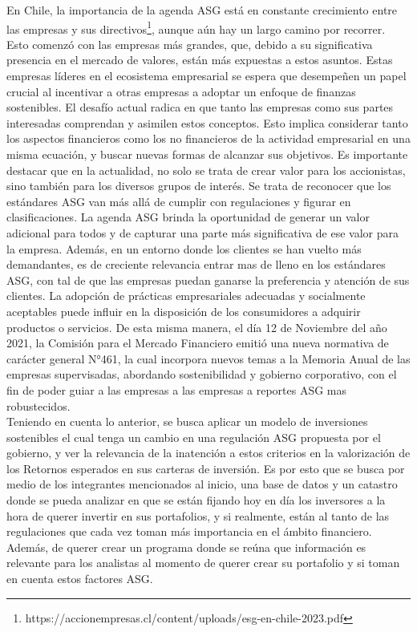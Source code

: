 En Chile, la importancia de la agenda ASG está en constante crecimiento entre las empresas y sus directivos\footnote{https://accionempresas.cl/content/uploads/esg-en-chile-2023.pdf}, aunque aún hay un largo camino por recorrer. Esto comenzó con las empresas más grandes, que, debido a su significativa presencia en el mercado de valores, están más expuestas a estos asuntos. Estas empresas líderes en el ecosistema empresarial se espera que desempeñen un papel crucial al incentivar a otras empresas a adoptar un enfoque de finanzas sostenibles. El desafío actual radica en que tanto las empresas como sus partes interesadas comprendan y asimilen estos conceptos. Esto implica considerar tanto los aspectos financieros como los no financieros de la actividad empresarial en una misma ecuación, y buscar nuevas formas de alcanzar sus objetivos. Es importante destacar que en la actualidad, no solo se trata de crear valor para los accionistas, sino también para los diversos grupos de interés. Se trata de reconocer que los estándares ASG van más allá de cumplir con regulaciones y figurar en clasificaciones. La agenda ASG brinda la oportunidad de generar un valor adicional para todos y de capturar una parte más significativa de ese valor para la empresa. Además, en un entorno donde los clientes se han vuelto más demandantes, es de creciente relevancia entrar mas de lleno en los estándares ASG, con tal de que las empresas puedan ganarse la preferencia y atención de sus clientes. La adopción de prácticas empresariales adecuadas y socialmente aceptables puede influir en la disposición de los consumidores a adquirir productos o servicios.
De esta misma manera, el día 12 de Noviembre del año 2021, la Comisión para el Mercado Financiero emitió una nueva normativa de carácter general N°461, la cual incorpora nuevos temas a la Memoria Anual de las empresas supervisadas, abordando sostenibilidad y gobierno corporativo, con el fin de poder guiar a las empresas a las empresas a reportes ASG mas robustecidos.
\\

Teniendo en cuenta lo anterior, se busca aplicar un modelo de inversiones sostenibles el cual tenga un cambio en una regulación ASG propuesta por el gobierno, y ver la relevancia de la inatención a estos criterios en la valorización de los Retornos esperados en sus carteras de inversión. Es por esto que se busca por medio de los integrantes mencionados al inicio, una base de datos y un catastro donde se pueda analizar en que se están fijando hoy en día los inversores a la hora de querer invertir en sus portafolios, y si realmente, están al tanto de las regulaciones que cada vez toman más importancia en el ámbito financiero. Además, de querer crear un programa donde se reúna que información es relevante para los analistas al momento de querer crear su portafolio y si toman en cuenta estos factores ASG.

